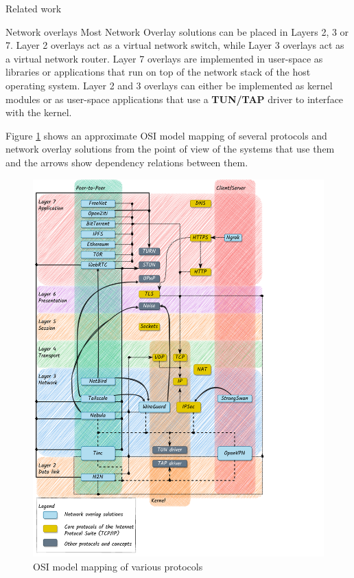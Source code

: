 \begin{frame}[fragile]{Related work}
\begin{block}{Network overlays}
\protect\hypertarget{thesis__020-related-work.md__network-overlays}{}
Most Network Overlay solutions can be placed in Layers 2, 3 or 7. Layer
2 overlays act as a virtual network switch, while Layer 3 overlays act
as a virtual network router. Layer 7 overlays are implemented in
user-space as libraries or applications that run on top of the network
stack of the host operating system. Layer 2 and 3 overlays can either be
implemented as kernel modules or as user-space applications that use a
\textbf{TUN/TAP} driver to interface with the kernel.

Figure \ref{osi-map-overlays} shows an approximate OSI model mapping of
several protocols and network overlay solutions from the point of view
of the systems that use them and the arrows show dependency relations
between them.

\begin{figure}
\centering
\includegraphics[width=\textwidth,height=0.9\textheight]{thesis/../figures/osi-map-overlays.drawio.pdf}
\caption{OSI model mapping of various protocols
\label{osi-map-overlays}}
\end{figure}


\end{block}
\end{frame}

